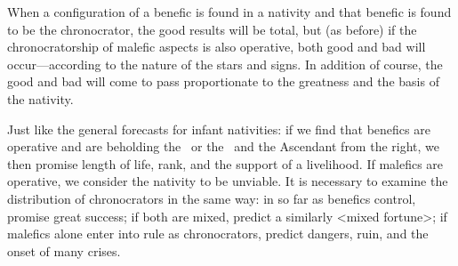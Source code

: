 When a configuration of a benefic is found in a nativity and that benefic is found to be the chronocrator, the good results will be total,
but (as before) if the chronocratorship of malefic aspects is also operative, both good and bad will occur—according to the nature of the stars and signs. In addition of course, the good and bad will come to pass proportionate to the greatness and the basis of the nativity.

Just  like the general forecasts for infant nativities: if we find that benefics are operative and are beholding the \Sun\, or the \Moon\, and the Ascendant from the right, we then promise length of life, rank, and the support of a livelihood. If malefics are operative, we consider the nativity to be unviable. It is necessary to examine the distribution of
chronocrators in the same way: in so far as benefics control, promise great success; if both are mixed, predict a similarly <mixed fortune>; if malefics alone enter into rule as chronocrators, predict dangers, ruin, and the onset of many crises.

